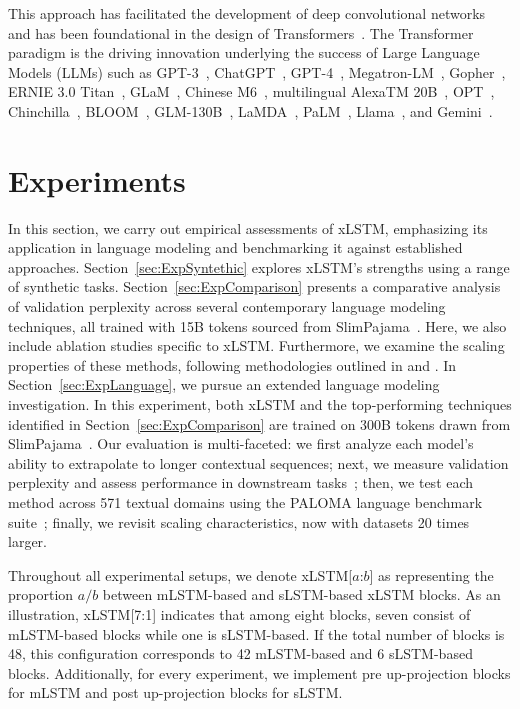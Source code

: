 This approach has facilitated the development of deep convolutional networks~\citep{He:16} and has been foundational in the design of Transformers~\citep{Vaswani:17}. The Transformer paradigm is the driving innovation underlying the success of Large Language Models (LLMs) such as GPT-3~\citep{Brown:20short}, ChatGPT~\citep{Schulman:22short}, GPT-4~\citep{Achiam:23gpt4short}, Megatron-LM~\citep{Shoeybi:19}, Gopher~\citep{Rae:21short}, ERNIE 3.0 Titan~\citep{Wang:21arxivshort}, GLaM~\citep{Du:21glamshort}, Chinese M6~\citep{Lin:21}, multilingual AlexaTM 20B~\citep{Soltan:22}, OPT~\citep{Zhang:22opt}, Chinchilla~\citep{Hoffmann:22short}, BLOOM~\citep{Scao:22arxivshort}, GLM-130B~\citep{Zeng:22arxivshort}, LaMDA~\citep{Thoppilan:22short}, PaLM~\citep{Chowdhery:22short}, Llama~\citep{Touvron:23arxiv}, and Gemini~\citep{GeminiTeam:23arxiv,Reid:24arxiv}.

\section{Experiments}
\label{sec:Exp}

In this section, we carry out empirical assessments of xLSTM, emphasizing its application in language modeling and benchmarking it against established approaches. Section~\ref{sec:ExpSyntethic} explores xLSTM’s strengths using a range of synthetic tasks. 
Section~\ref{sec:ExpComparison} presents a comparative analysis of validation perplexity across several contemporary language modeling techniques, all trained with 15B tokens sourced from SlimPajama~\citep{Soboleva:23}. Here, we also include ablation studies specific to xLSTM. Furthermore, we examine the scaling properties of these methods, following methodologies outlined in \citet{Kaplan:20} and \citet{Brown:20short}.  
In Section~\ref{sec:ExpLanguage}, 
we pursue an extended language modeling investigation. In this experiment, both xLSTM and the top-performing techniques identified in Section~\ref{sec:ExpComparison} are trained on 300B tokens drawn from SlimPajama~\citep{Soboleva:23}. Our evaluation is multi-faceted: we first analyze each model’s ability to extrapolate to longer contextual sequences; next, we measure validation perplexity and assess performance in downstream tasks~\citep{Sutawika:24}; then, we test each method across 571 textual domains using the PALOMA language benchmark suite~\citep{Magnusson:23arxivshort}; finally, we revisit scaling characteristics, now with datasets 20 times larger.

\label{sec:xlstm_blocks_notation}
Throughout all experimental setups, we denote xLSTM[$a$:$b$] as representing the proportion $a/b$ between mLSTM-based and sLSTM-based xLSTM blocks. As an illustration, xLSTM[7:1] indicates that among eight blocks, seven consist of mLSTM-based blocks while one is sLSTM-based. If the total number of blocks is 48, this configuration corresponds to 42 mLSTM-based and 6 sLSTM-based blocks. Additionally, for every experiment, we implement pre up-projection blocks for mLSTM and post up-projection blocks for sLSTM.

